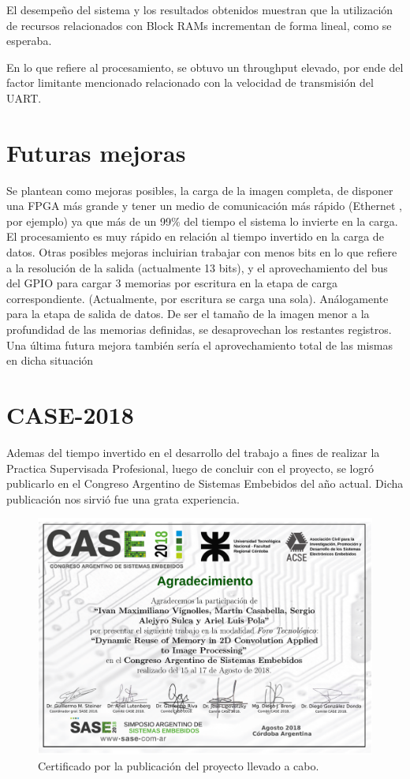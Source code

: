 El desempeño del sistema y los resultados obtenidos muestran que la utilización
de recursos relacionados con Block RAMs incrementan de forma lineal, como se
esperaba. 

En lo que refiere al procesamiento, se obtuvo un throughput elevado, por ende
del factor limitante mencionado relacionado con la velocidad de transmisión del
UART.

\section{Futuras mejoras}
Se plantean como mejoras posibles, la carga de la imagen completa, de disponer una FPGA más grande y tener un medio de comunicación más rápido (Ethernet , por ejemplo) 
ya que más de un 99$\%$ del tiempo el sistema lo invierte en la carga. El procesamiento es muy rápido en relación al tiempo invertido en la carga de datos.
Otras posibles mejoras incluirian trabajar con menos bits en lo que refiere a la resolución de la salida (actualmente 13 bits),  y el aprovechamiento del bus del GPIO para cargar 3 memorias por escritura en la etapa 
de carga correspondiente. (Actualmente, por escritura se carga una sola). Análogamente para la etapa de salida de datos.
De ser el tamaño de la imagen menor a la profundidad de las memorias definidas, se desaprovechan los restantes registros. 
Una última  futura mejora también sería el aprovechamiento total de las mismas en dicha situación

\section{CASE-2018}
Ademas del tiempo invertido en el desarrollo del trabajo a fines de realizar la
Practica Supervisada Profesional, luego de concluir con el proyecto, se logró
publicarlo en el Congreso Argentino de Sistemas Embebidos del año actual. Dicha
publicación nos sirvió fue una grata experiencia.

\begin{figure}
\centering
\includegraphics[scale=0.5]{certificado_CASE}
\caption{Certificado por la publicación del proyecto llevado a cabo.}
\label{CASE}
\end{figure}